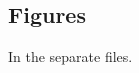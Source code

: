 \documentclass{bmcart}
\begin{document}
\begin{backmatter}




\section*{Figures}

In the separate files.

 
 
% 
 

\end{backmatter}
\end{document}
